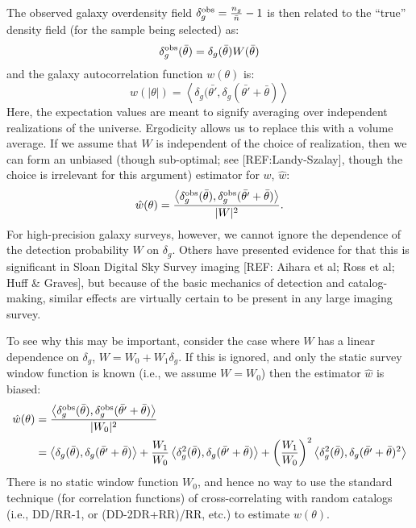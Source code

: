 \documentclass[12pt]{book}
\begin{document}
The observed galaxy overdensity field $\delta_g^{\rm obs} =
\frac{n_g}{\bar{n}}-1$ is then related to the ``true'' density field
(for the sample being selected) as:
\begin{equation}
\delta_g^{\rm obs}(\bar{\theta}) = \delta_g(\bar{\theta}) W(\bar{\theta})
\end{equation}
and the galaxy autocorrelation function $w(\theta)$ is:
\begin{equation}
w(|\theta|) = \left<\delta_g (\bar{\theta'}, \delta_g (\bar{\theta'}+\bar{\theta})\right>
\end{equation}
Here, the expectation values are meant to signify averaging over
independent realizations of the universe. Ergodicity allows us to
replace this with a volume average. If we assume that $W$ is
independent of the choice of realization, then we can form an unbiased
(though sub-optimal; see [REF:Landy-Szalay], though the choice is
irrelevant for this argument) estimator for $w$, $\hat{w}$:
\begin{equation}
\hat{w}(\theta) = \frac{\left<\delta_g^{\rm obs}(\bar{\theta}),
    \delta_g^{\rm obs}(\bar{\theta'}+\bar{\theta})\right>}{|W|^2}.
\end{equation}
For high-precision galaxy surveys, however, we cannot ignore the
dependence of the detection probability $W$ on $\delta_g$. Others have
presented evidence for that this is significant in Sloan Digital Sky
Survey imaging [REF: Aihara et al; Ross et al; Huff \& Graves], but
because of the basic mechanics of detection and catalog-making,
similar effects are virtually certain to be present in any large
imaging survey.

To see why this may be important, consider the case where $W$ has a
linear dependence on $\delta_g$, $W = W_0 + W_1 \delta_g$. If this is
ignored, and only the static survey window function is known (i.e., we
assume $W = W_0$) then the estimator $\hat{w}$ is biased:
\begin{align}
\hat{w}(\theta) &= \frac{\left<\delta_g^{\rm obs}(\bar{\theta}),
    \delta_g^{\rm obs}(\bar{\theta'}+\bar{\theta})\right>}{|W_0|^2} \\
&=
\left<\delta_g(\bar{\theta}),\delta_g(\bar{\theta'}+\bar{\theta})\right>
+ \frac{W_1}{W_0}\left<\delta_g^2(\bar{\theta}),
  \delta_g(\bar{\theta'}+\bar{\theta})\right> + \left(\frac{W_1}{W_0}\right)^2\left<\delta_g^2(\bar{\theta}),\delta_g(\bar{\theta'}+\bar{\theta})^2\right>
\end{align}
There is no static window function $W_0$, and hence no way to use the
standard technique (for correlation functions) of cross-correlating
with random catalogs (i.e., DD/RR-1, or (DD-2DR+RR)/RR, etc.) to
estimate $w(\theta)$.
\end{document}
